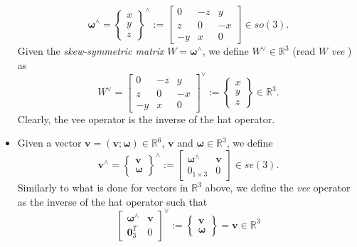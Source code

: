\begin{itemize}
    \begin{equation}
     {\bm{\omega}}^\wedge = \begin{Bmatrix} x\\ y \\ z \end{Bmatrix}^\wedge := \begin{bmatrix} 0 & -z & y \\ z & 0 & -x \\ -y & x & 0 \end{bmatrix} \in so(3).
    \end{equation}
    Given the \textit{skew-symmetric matrix} $W = \bm{\omega}^\wedge$, we define $ {W}^\vee \in \mathbb{R}^{3}$ (read $W$ \textit{vee} ) as
    \begin{equation}
     {W}^\vee = \begin{bmatrix} 0 & -z & y \\ z & 0 & -x \\ -y & x & 0 \end{bmatrix}^\vee:= \begin{Bmatrix} x \\ y \\ z \end{Bmatrix} \in \mathbb{R}^3.
    \end{equation}
    Clearly, the vee operator is the inverse of the hat operator.
    \item Given a vector $\mathbf{v} = (\bm{v}; \bm{\omega}) \in \mathbb{R}^6$, $\bm{v}$ and $\bm{\omega} \in \mathbb{R}^3$, we define
    \begin{equation}
    \mathbf{v}^\wedge = \begin{Bmatrix} \bm{v} \\ \bm{\omega} \end{Bmatrix}^\wedge := \begin{bmatrix} \bm{\omega}^\wedge & \bm{v} \\  0_{1 \times 3} & 0 \end{bmatrix} \in se(3).
    \end{equation}
    Similarly to what is done for vectors in $\mathbb{R}^3$ above, we define the \textit{vee} operator as the inverse of the hat operator such that
    \begin{equation}
    \begin{bmatrix} \bm{\omega}^\wedge & \bm{v} \\  \mathbf{0}_{3}^{T} & 0 \end{bmatrix}^\vee := \begin{Bmatrix} \bm{v} \\ \bm{\omega} \end{Bmatrix} =  \mathbf{v} \in \mathbb{R}^3
    \end{equation}
\end{itemize}

